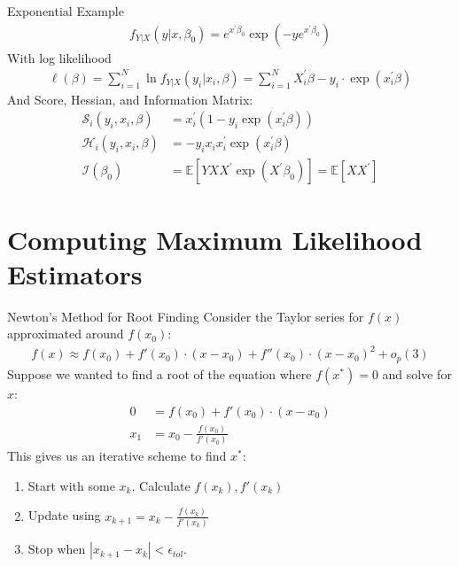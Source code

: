 \documentclass[aspectratio=169]{beamer}
\begin{document}
\begin{frame}{Exponential Example}
\begin{align*}
f _ { Y | X } ( y | x , \beta _ { 0 } ) =  { e } ^ { x ^ { \prime } \beta _ { 0 } } \exp \left( - y  { e } ^ { x ^ { \prime } \beta _ { 0 } } \right)
\end{align*}
With log likelihood
\begin{align*}
\ell( \beta ) = \sum _ { i = 1 } ^ { N } \ln f _ { Y | X } \left( y _ { i } | x _ { i } , \beta \right) = \sum _ { i = 1 } ^ { N } X _ { i } ^ { \prime } \beta - y _ { i } \cdot \exp \left( x _ { i } ^ { \prime } \beta \right)
\end{align*}
And Score, Hessian, and Information Matrix:
\begin{align*}
\mathcal { S }_i ( y_i, x_i , \beta ) &= x_i ^ { \prime } \left( 1 - y_i \exp \left( x_i ^ { \prime } \beta \right) \right)\\
\mathcal { H }_i ( y_i , x_i , \beta ) &= - y_i x_i x_i ^ { \prime } \exp \left( x_i ^ { \prime } \beta \right)\\
\mathcal { I } \left( \beta _ { 0 } \right) &= \mathbb { E } \left[ Y X X ^ { \prime } \exp \left( X ^ { \prime } \beta _ { 0 } \right) \right] = \mathbb { E } \left[ X X ^ { \prime } \right]
\end{align*}
\end{frame}


\section*{Computing Maximum Likelihood Estimators}

\begin{frame}{Newton's Method for Root Finding}
Consider the Taylor series for $f(x)$ approximated around $f(x_0)$:
\begin{align*}
f(x) \approx f(x_0) + f'(x_0) \cdot (x-x_0) + f''(x_0) \cdot (x-x_0)^2 + o_p(3)
\end{align*}
Suppose we wanted to find a \alert{root} of the equation where $f(x^{*})=0$ and solve for $x$:
\begin{align*}
0 &= f(x_0) + f'(x_0) \cdot (x-x_0) \\
x_1 &= x_0-\frac{f(x_0)}{f'(x_0)} 
\end{align*}
This gives us an \alert{iterative} scheme to find $x^{*}$:
\begin{enumerate}
\item Start with some $x_k$. Calculate $f(x_k),f'(x_k)$
\item Update using $x_{k+1} = x_k - \frac{f(x_k)}{f'(x_k)} $
\item Stop when $|x_{k+1}-x_{k}| < \epsilon_{tol}$.
\end{enumerate}
\end{frame}
\end{document}
